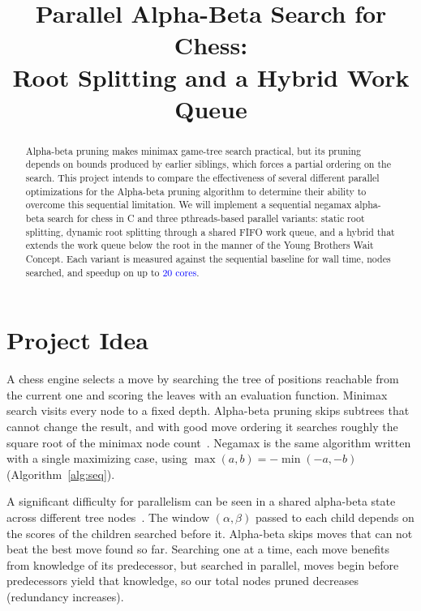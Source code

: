\documentclass[10pt, conference, compsocconf]{IEEEtran}
\newcommand{\rev}[1]{\textcolor{blue}{#1}}
\begin{document}
\title{Parallel Alpha-Beta Search for Chess:\\ Root Splitting and a Hybrid Work Queue}

\author{
}

\maketitle

\begin{abstract}
Alpha-beta pruning makes minimax game-tree search practical, but its pruning depends on bounds produced by earlier siblings, which forces a partial ordering on the search. This project intends to compare the effectiveness of several different parallel optimizations for the Alpha-beta pruning algorithm to determine their ability to overcome this sequential limitation. We will implement a sequential negamax alpha-beta search for chess in C and three pthreads-based parallel variants: static root splitting, dynamic root splitting through a shared FIFO work queue, and a hybrid that extends the work queue below the root in the manner of the Young Brothers Wait Concept. Each variant is measured against the sequential baseline for wall time, nodes searched, and speedup on up to \rev{20 cores}.
\end{abstract}

\section{Project Idea}

A chess engine selects a move by searching the tree of positions reachable from the current one and scoring the leaves with an evaluation function. Minimax search visits every node to a fixed depth. Alpha-beta pruning skips subtrees that cannot change the result, and with good move ordering it searches roughly the square root of the minimax node count~\cite{knuth1975}. Negamax is the same algorithm written with a single maximizing case, using $\max(a,b) = -\min(-a,-b)$~\cite{knuth1975} (Algorithm~\ref{alg:seq}).

A significant difficulty for parallelism can be seen in a shared alpha-beta state across different tree nodes~\cite{marsland1982}. The window $(\alpha, \beta)$ passed to each child depends on the scores of the children searched before it. Alpha-beta skips moves that can not beat the best move found so far. Searching one at a time, each move benefits from knowledge of its predecessor, but searched in parallel, moves begin before predecessors yield that knowledge, so our total nodes pruned decreases (redundancy increases).
\end{document}
